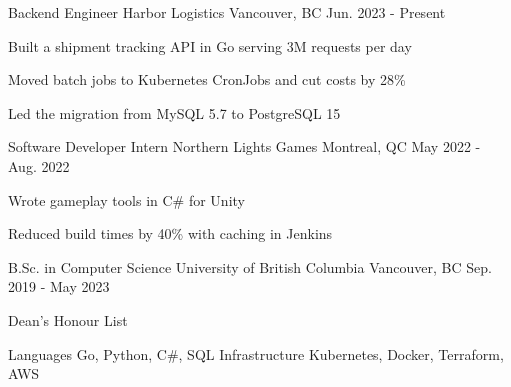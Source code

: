 \documentclass[11pt, a4paper]{awesome-cv}
\begin{document}
\makecvheader

\begin{cventries}
  \cventry
    {Backend Engineer} %
    {Harbor Logistics} %
    {Vancouver, BC} %
    {Jun. 2023 - Present} %
    {
      \begin{cvitems} %
        \item {Built a shipment tracking API in Go serving 3M requests per day}
        \item {Moved batch jobs to Kubernetes CronJobs and cut costs by 28\%}
        \item {Led the migration from MySQL 5.7 to PostgreSQL 15}
      \end{cvitems}
    }
  \cventry
    {Software Developer Intern} %
    {Northern Lights Games} %
    {Montreal, QC} %
    {May 2022 - Aug. 2022} %
    {
      \begin{cvitems} %
        \item {Wrote gameplay tools in C\# for Unity}
        \item {Reduced build times by 40\% with caching in Jenkins}
      \end{cvitems}
    }
\end{cventries}

\begin{cventries}
  \cventry
    {B.Sc. in Computer Science} %
    {University of British Columbia} %
    {Vancouver, BC} %
    {Sep. 2019 - May 2023} %
    {
      \begin{cvitems} %
        \item {Dean's Honour List}
      \end{cvitems}
    }
\end{cventries}

\begin{cvskills}
  \cvskill
    {Languages} %
    {Go, Python, C\#, SQL} %
  \cvskill
    {Infrastructure} %
    {Kubernetes, Docker, Terraform, AWS} %
\end{cvskills}
\end{document}
